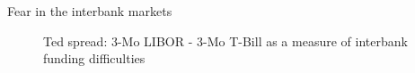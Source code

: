 \begin{frame}{Fear in the interbank markets}

\begin{figure}
\begin{center}


\caption{\label{fig:L4_ted_spread} Ted spread: 3-Mo LIBOR - 3-Mo T-Bill as a measure of interbank funding difficulties}

\end{center}
\end{figure}

\end{frame}



